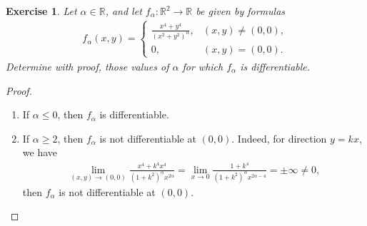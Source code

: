 \documentclass[11pt]{article}
\newtheorem{exercise}{Exercise}[section]
\theoremstyle{definition}
\numberwithin{equation}{subsection}
\begin{document}
\begin{exercise}{\rm *}
Let $\alpha \in \mathbb{R}$, and let $f_\alpha: \mathbb{R}^2 \to \mathbb{R}$ be given by formulas
\begin{align*}
    f_{\alpha}(x,y) = \begin{cases}
          \frac{x^4 + y^4}{(x^2 + y^2)^{\alpha}}, & (x,y) \neq (0,0), \\
        0, & (x, y) = (0,0).
    \end{cases}
\end{align*}
Determine with proof, those values of $\alpha$ for which $f_{\alpha}$ is differentiable.
\end{exercise}
\begin{proof}
~\begin{enumerate}[label=(\alph*)]
    \item If $\alpha \leq 0$, then $f_\alpha$ is differentiable.
    
    \item If $\alpha \geq 2$, then $f_\alpha$ is not differentiable at $(0,0)$. Indeed, for direction $y = kx$, we have
    \begin{align*}
        \lim_{(x,y) \to (0,0)} \frac{x^4 + k^4x^4}{(1 + k^2)^{\alpha} x^{2\alpha}} = \lim_{x \to 0} \frac{1 + k^4}{(1 + k^2)^{\alpha} x^{2\alpha - 4}} = \pm \infty \neq 0,
    \end{align*}
    then $f_\alpha$ is not differentiable at $(0,0)$.
    

\end{enumerate}
\end{proof}
\end{document}

